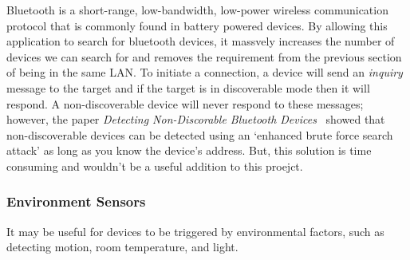 Bluetooth is a short-range, low-bandwidth, low-power wireless communication protocol that is commonly found in battery powered devices. By allowing this application to search for bluetooth devices, it massvely increases the number of devices we can search for and removes the requirement from the previous section of being in the same LAN.
\x
To initiate a connection, a device will send an \textit{inquiry} message to the target and if the target is in discoverable mode then it will respond. A non-discoverable device will never respond to these messages;
however, the paper \textit{Detecting Non-Discorable Bluetooth Devices}~\cite{} showed that non-discoverable devices can be detected using an `enhanced brute force search attack' as long as you know the device's address. But, this solution is time consuming and wouldn't be a useful addition to this proejct.

\subsubsection{Environment Sensors}

It may be useful for devices to be triggered by environmental factors, such as detecting motion, room temperature, and light.
